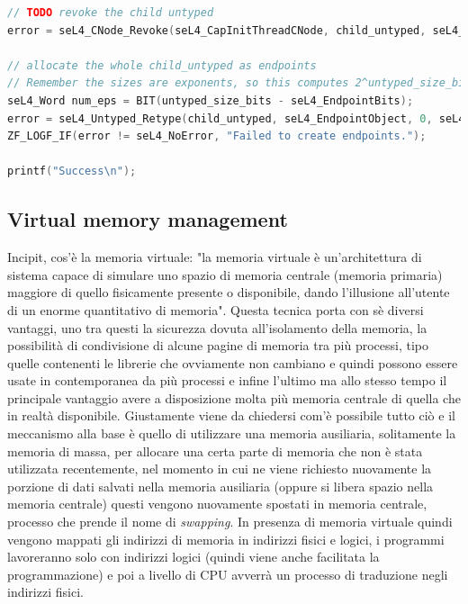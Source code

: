 \begin{lstlisting}[language=C++]
// TODO revoke the child untyped
error = seL4_CNode_Revoke(seL4_CapInitThreadCNode, child_untyped, seL4_WordBits);

// allocate the whole child_untyped as endpoints
// Remember the sizes are exponents, so this computes 2^untyped_size_bits / 2^seL4_EndpointBits:
seL4_Word num_eps = BIT(untyped_size_bits - seL4_EndpointBits);
error = seL4_Untyped_Retype(child_untyped, seL4_EndpointObject, 0, seL4_CapInitThreadCNode, 0, 0, child_tcb, num_eps);
ZF_LOGF_IF(error != seL4_NoError, "Failed to create endpoints.");

printf("Success\n");
\end{lstlisting}

\subsection{Virtual memory management}
Incipit, cos'è la memoria virtuale: "la memoria virtuale è un'architettura di sistema capace di simulare uno spazio di memoria centrale (memoria primaria) maggiore di quello fisicamente presente o disponibile, dando l'illusione all'utente di un enorme quantitativo di memoria". \cite{MemoriaVirtuale} Questa tecnica porta con sè diversi vantaggi, uno tra questi la sicurezza dovuta all'isolamento della memoria, la possibilità di condivisione di alcune pagine di memoria tra più processi, tipo quelle contenenti le librerie che ovviamente non cambiano e quindi possono essere usate in contemporanea da più processi e infine l'ultimo ma allo stesso tempo il principale vantaggio avere a disposizione molta più memoria centrale di quella che in realtà disponibile. Giustamente viene da chiedersi com'è possibile tutto ciò e il meccanismo alla base è quello di utilizzare una memoria ausiliaria, solitamente la memoria di massa, per allocare una certa parte di memoria che non è stata utilizzata recentemente, nel momento in cui ne viene richiesto nuovamente la porzione di dati salvati nella memoria ausiliaria (oppure si libera spazio nella memoria centrale) questi vengono nuovamente spostati in memoria centrale, processo che prende il nome di \textit{swapping}. In presenza di memoria virtuale quindi vengono mappati gli indirizzi di memoria in indirizzi fisici e logici, i programmi lavoreranno solo con indirizzi logici (quindi viene anche facilitata la programmazione) e poi a livello di CPU avverrà un processo di traduzione negli indirizzi fisici.\\
